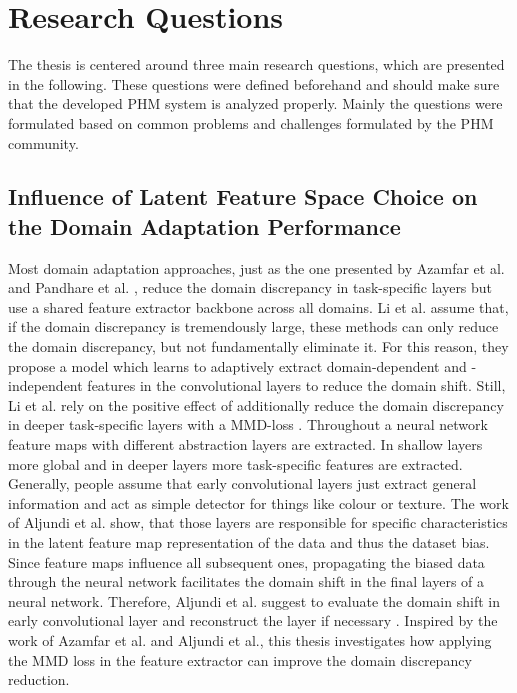 \section{Research Questions}
The thesis is centered around three main research questions, which are presented in the following. These questions were defined beforehand and should make sure that the developed PHM system is analyzed properly. Mainly the questions were formulated based on common problems and challenges formulated by the PHM community. 

\subsection{Influence of Latent Feature Space Choice on the Domain Adaptation Performance}
Most domain adaptation approaches, just as the one presented by Azamfar et al. \cite{AZAMFAR2020103932} and Pandhare et al. \cite{Pandhare2021}, reduce the domain discrepancy in task-specific layers but use a shared feature extractor backbone across all domains. Li et al. \cite{li2020} assume that, if the domain discrepancy is tremendously large, these methods can only reduce the domain discrepancy, but not fundamentally eliminate it. For this reason, they propose a model which learns to adaptively extract domain-dependent and -independent features in the convolutional layers to reduce the domain shift. Still, Li et al. rely on the positive effect of additionally reduce the domain discrepancy in deeper task-specific layers with a MMD-loss \cite{li2020}. Throughout a neural network feature maps with different abstraction layers are extracted. In shallow layers more global and in deeper layers more task-specific features are extracted. Generally, people assume that early convolutional layers just extract general information and act as simple detector for things like colour or texture. The work of Aljundi et al. \cite{Aljundi2016} show, that those layers are responsible for specific characteristics in the latent feature map representation of the data and thus the dataset bias. Since feature maps influence all subsequent ones, propagating the biased data through the neural network facilitates the domain shift in the final layers of a neural network. Therefore, Aljundi et al. suggest to evaluate the domain shift in early convolutional layer and reconstruct the layer if necessary \cite{Aljundi2016}. Inspired by the work of Azamfar et al. and Aljundi et al., this thesis investigates how applying the MMD loss in the feature extractor can improve the domain discrepancy reduction.


